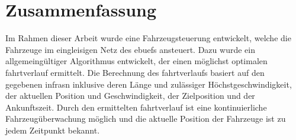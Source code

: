 \section*{Zusammenfassung}
Im Rahmen dieser Arbeit wurde eine Fahrzeugsteuerung entwickelt, welche die Fahrzeuge im eingleisigen Netz des \acfp{ebuef} ansteuert. Dazu wurde ein allgemeingültiger Algorithmus entwickelt, der einen möglichst optimalen \Gls{fahrtverlauf} ermittelt. Die Berechnung des \Gls{fahrtverlauf}s basiert auf den gegebenen \aclp{infra}n inklusive deren Länge und zulässiger Höchstgeschwindigkeit, der aktuellen Position und Geschwindigkeit, der Zielposition und der Ankunftszeit. Durch den ermittelten \Gls{fahrtverlauf} ist eine kontinuierliche Fahrzeugüberwachung möglich und die aktuelle Position der Fahrzeuge ist zu jedem Zeitpunkt bekannt.
%
%
